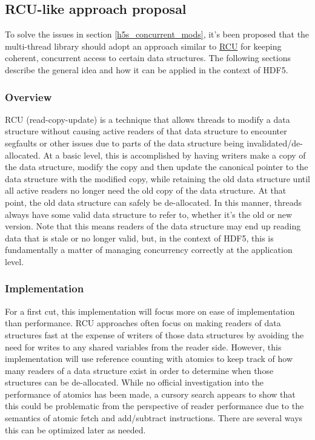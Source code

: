 \documentclass[../HDF5_RFC.tex]{subfiles}
\begin{document}
\subsection{RCU-like approach proposal}
\label{h5s_concurrency_rcu}

To solve the issues in section \ref{h5s_concurrent_mods}, it's been proposed that the multi-thread
library should adopt an approach similar to \href{https://en.wikipedia.org/wiki/Read-copy-update}{RCU}
for keeping coherent, concurrent access to certain data structures. The following sections describe the
general idea and how it can be applied in the context of HDF5.

\subsubsection{Overview}

RCU (read-copy-update) is a technique that allows threads to modify a data structure without causing
active readers of that data structure to encounter segfaults or other issues due to parts of the data
structure being invalidated/de-allocated. At a basic level, this is accomplished by having writers make
a copy of the data structure, modify the copy and then update the canonical pointer to the data structure
with the modified copy, while retaining the old data structure until all active readers no longer need the
old copy of the data structure. At that point, the old data structure can safely be de-allocated. In this
manner, threads always have some valid data structure to refer to, whether it's the old or new version.
Note that this means readers of the data structure may end up reading data that is stale or no longer
valid, but, in the context of HDF5, this is fundamentally a matter of managing concurrency correctly at
the application level.

\subsubsection{Implementation}

For a first cut, this implementation will focus more on ease of implementation than performance. RCU approaches often focus on making readers of data structures fast at the expense of writers of those
data structures by avoiding the need for writes to any shared variables from the reader side. However,
this implementation will use reference counting with atomics to keep track of how many readers of a data
structure exist in order to determine when those structures can be de-allocated. While no official
investigation into the performance of atomics has been made, a cursory search appears to show that this
could be problematic from the perspective of reader performance due to the semantics of atomic fetch and
add/subtract instructions. There are several ways this can be optimized later as needed.
\end{document}
